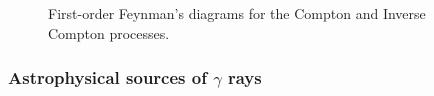 \begin{itemize}
    \begin{figure}[h!]
        \centering
            \hfill
            \caption{
                First-order Feynman's diagrams for the Compton and
                Inverse Compton processes.
            }
           \label{fig:compton_feynman}
    \end{figure}
\end{itemize}




\subsubsection{Astrophysical sources of $\gamma$ rays}


